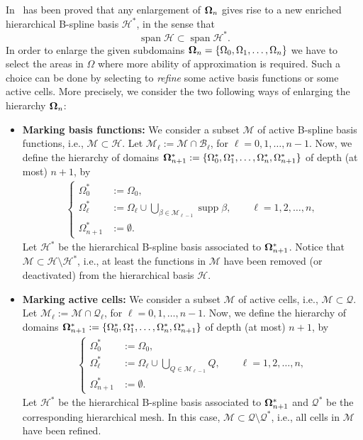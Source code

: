\documentclass[12pt,a4paper,pdftex]{article}
\theoremstyle{plain}
\theoremstyle{definition}
\theoremstyle{remark}
\newcommand{\D}{\displaystyle}
\DeclareMathOperator{\supp}{supp}
\DeclareMathOperator{\Span}{span}
\newcommand\BB{\mathcal B}
\newcommand\MM{\mathcal M}
\newcommand\QQ{\mathcal Q}
\newcommand\HH{\mathcal H}
\begin{document}
In~\cite{GJS14} has been proved that any enlargement of ${\bf\Omega}_n$ gives rise to a new enriched hierarchical B-spline basis $\HH^*$, in the sense that
$$\Span\HH\subset\Span\HH^*.$$
In order to enlarge the given subdomains ${\bf\Omega}_n = \{\Omega_0,\Omega_1,\dots,\Omega_n\}$ we have to select the areas in $\Omega$ where more ability of approximation is required. Such a choice can be done by selecting to \emph{refine} some active basis functions or some active cells. More precisely, we consider the two following ways of enlarging the hierarchy ${\bf\Omega}_n$:
\begin{itemize}
 \item {\bf Marking basis functions:} We consider a subset $\MM$ of active B-spline basis functions, i.e., $\MM\subset\HH$. Let $\MM_\ell:=\MM\cap\BB_\ell$, for $\ell = 0,1,\dots,n-1$. Now, we define the hierarchy of domains ${\bf\Omega}^*_{n+1} := 
\{\Omega_0^*,\Omega_1^*,\dots,\Omega_n^*,\Omega_{n+1}^*\}$ of depth (at most) 
$n+1$, by
\begin{align}\label{E:marking basis functions}
\begin{cases}\Omega_0^* &:=\Omega_0,\\
\Omega_{\ell}^* &:=\Omega_{\ell}\cup \D\bigcup_{\beta\in\MM_{\ell-1}}\supp 
\beta,\qquad \ell = 1,2,\dots,n,\\
\Omega_{n+1}^*&:= \emptyset.
\end{cases}
\end{align}
Let $\HH^*$ be the hierarchical B-spline basis associated to ${\bf\Omega}^*_{n+1}$. Notice that $\MM\subset\HH\setminus\HH^*$, i.e., at least the functions in $\MM$ have been removed (or deactivated) from the hierarchical basis $\HH$. 
\item {\bf Marking active cells:} We consider a subset $\MM$ of active cells, i.e., $\MM\subset\QQ$. Let $\MM_\ell:=\MM\cap\QQ_\ell$, for $\ell = 0,1,\dots,n-1$. Now, we define the hierarchy of domains ${\bf\Omega}^*_{n+1} := 
\{\Omega_0^*,\Omega_1^*,\dots,\Omega_n^*,\Omega_{n+1}^*\}$ of depth (at most) 
$n+1$, by
\begin{align}\label{E:marking active cells}
\begin{cases}\Omega_0^* &:=\Omega_0,\\
\Omega_{\ell}^* &:=\Omega_{\ell}\cup \D\bigcup_{Q\in\MM_{\ell-1}}Q,\qquad \ell = 1,2,\dots,n,\\
\Omega_{n+1}^*&:= \emptyset.
\end{cases}
\end{align}
Let $\HH^*$ be the hierarchical B-spline basis associated to ${\bf\Omega}^*_{n+1}$ and $\QQ^*$ be the corresponding hierarchical mesh. In this case, $\MM\subset\QQ\setminus\QQ^*$, i.e., all cells in $\MM$ have been refined. 
\end{itemize}
\end{document}
